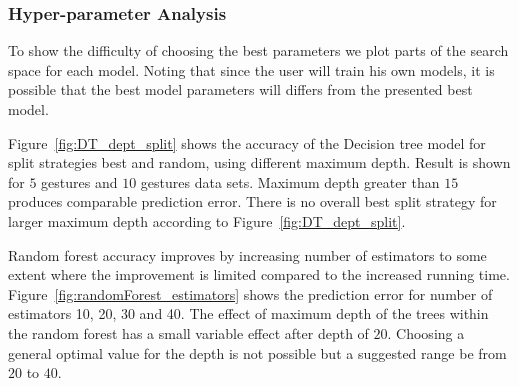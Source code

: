 \documentclass{article}
\begin{document}
\subsubsection{Hyper-parameter Analysis}
To show the difficulty of choosing the best parameters we plot parts of the search space for each model. Noting that since the user will train his own models, it is possible that the best model parameters will differs from the presented best model.


Figure~\ref{fig:DT_dept_split} shows the accuracy of the Decision tree model for split strategies best and random, using different maximum depth. Result is shown for $5$ gestures and $10$ gestures data sets. Maximum depth greater than $15$ produces comparable prediction error. There is no overall best split strategy for larger maximum depth according to Figure~\ref{fig:DT_dept_split}.

Random forest accuracy improves by increasing number of estimators to some extent where the improvement is limited compared to the increased running time. Figure~\ref{fig:randomForest_estimators} shows the prediction error for number of estimators 10, 20, 30 and 40. The effect of maximum depth of the trees within the random forest has a small variable effect after depth of $20$. Choosing a general optimal value for the depth is not possible but a suggested range be from $20$ to $40$.


\end{document}
